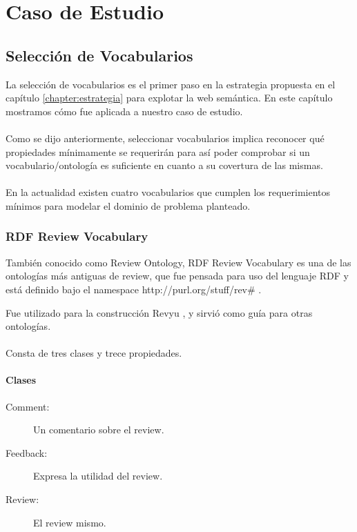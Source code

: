 \part{Caso de Estudio}

\chapter{Selección de Vocabularios}
\label{chapter:seleccion}
La selección de vocabularios es el primer paso en la estrategia propuesta en el capítulo \ref{chapter:estrategia} para explotar la web semántica. En este capítulo mostramos cómo fue aplicada a nuestro caso de estudio.
\\\\
Como se dijo anteriormente, seleccionar vocabularios implica reconocer qué \\\noindent propiedades mínimamente se requerirán para así poder comprobar 
si un vocabulario/ontología es suficiente en cuanto a su covertura de las mismas.\\\\
En la actualidad existen cuatro vocabularios que cumplen los requerimientos mínimos para modelar el dominio de problema planteado.

\section{RDF Review Vocabulary}
\label{section:review-ontology}

También conocido como Review Ontology, RDF Review Vocabulary es una de las ontologías más antiguas de review, que fue pensada para uso del lenguaje 
RDF y está definido bajo el namespace http://purl.org/stuff/rev\# .

Fue utilizado para la construcción Revyu , y sirvió como guía para otras ontologías.
\\\\
Consta de tres clases y trece propiedades.
\subsection{Clases}
\begin{description}
  \item [Comment:] Un comentario sobre el review. 
  \item [Feedback:] Expresa la utilidad del review. 
  \item [Review:] El review mismo. 
\end{description}

